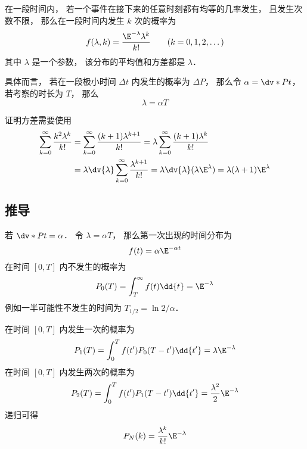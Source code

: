 
\begin{issues}
\issueDraft
\end{issues}

在一段时间内， 若一个事件在接下来的任意时刻都有均等的几率发生， 且发生次数不限， 那么在一段时间内发生 $k$ 次的概率为
\begin{equation}
f(\lambda, k) = \frac{\E^{-\lambda}\lambda^k}{k!} \qquad (k = 0,1,2,\dots)
\end{equation}
其中 $\lambda$ 是一个参数， 该分布的平均值和方差都是 $\lambda$．

具体而言， 若在一段极小时间 $\Delta t$ 内发生的概率为 $\Delta P$， 那么令 $\alpha = \dv*{P}{t}$， 若考察的时长为 $T$， 那么
\begin{equation}
\lambda = \alpha T
\end{equation}


证明方差需要使用
\begin{equation}
\begin{aligned}
\sum_{k=0}^\infty \frac{k^2\lambda^{k}}{k!}
&= \sum_{k=0}^\infty \frac{(k+1)\lambda^{k+1}}{k!}
= \lambda \sum_{k=0}^\infty \frac{(k+1)\lambda^k}{k!}\\
&= \lambda\dv{\lambda} \sum_{k=0}^\infty \frac{\lambda^{k+1}}{k!}
= \lambda \dv{\lambda} (\lambda \E^{\lambda})
= \lambda(\lambda+1)\E^{\lambda}
\end{aligned}
\end{equation}

\subsection{推导}
若 $\dv*{P}{t} = \alpha$． 令 $\lambda = \alpha T$， 那么第一次出现的时间分布为
\begin{equation}
f(t) = \alpha\E^{-\alpha t}
\end{equation}
在时间 $[0,T]$ 内不发生的概率为
\begin{equation}
P_0(T) = \int_{T}^\infty f(t) \dd{t} = \E^{-\lambda}
\end{equation}
例如一半可能性不发生的时间为 $T_{1/2} = \ln 2/\alpha$．

在时间 $[0,T]$ 内发生一次的概率为
\begin{equation}
P_1(T) = \int_{0}^{T} f(t') P_0(T-t')\dd{t'} = \lambda \E^{-\lambda}
\end{equation}
在时间 $[0,T]$ 内发生两次的概率为
\begin{equation}
P_2(T) = \int_{0}^{T} f(t') P_1(T-t')\dd{t'} = \frac{\lambda^2}{2}\E^{-\lambda}
\end{equation}
递归可得
\begin{equation}
P_N(k) = \frac{\lambda^k}{k!}\E^{-\lambda}
\end{equation}
